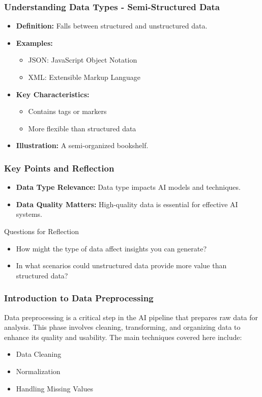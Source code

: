\documentclass[aspectratio=169]{beamer}
\begin{document}
\begin{frame}[fragile]
    \frametitle{Understanding Data Types - Semi-Structured Data}
    \begin{itemize}
        \item \textbf{Definition:} 
            Falls between structured and unstructured data.
        \item \textbf{Examples:}
            \begin{itemize}
                \item JSON: JavaScript Object Notation
                \item XML: Extensible Markup Language
            \end{itemize}
        \item \textbf{Key Characteristics:}
            \begin{itemize}
                \item Contains tags or markers
                \item More flexible than structured data
            \end{itemize}
        \item \textbf{Illustration:} 
            A semi-organized bookshelf.
    \end{itemize}
\end{frame}

\begin{frame}[fragile]
    \frametitle{Key Points and Reflection}
    \begin{itemize}
        \item \textbf{Data Type Relevance:} 
            Data type impacts AI models and techniques.
        \item \textbf{Data Quality Matters:} 
            High-quality data is essential for effective AI systems.
    \end{itemize}
    \begin{block}{Questions for Reflection}
        \begin{itemize}
            \item How might the type of data affect insights you can generate?
            \item In what scenarios could unstructured data provide more value than structured data?
        \end{itemize}
    \end{block}
\end{frame}

\begin{frame}[fragile]
    \frametitle{Introduction to Data Preprocessing}
    Data preprocessing is a critical step in the AI pipeline that prepares raw data for analysis. This phase involves cleaning, transforming, and organizing data to enhance its quality and usability. The main techniques covered here include:
    \begin{itemize}
        \item Data Cleaning
        \item Normalization
        \item Handling Missing Values
    \end{itemize}
\end{frame}
\end{document}
